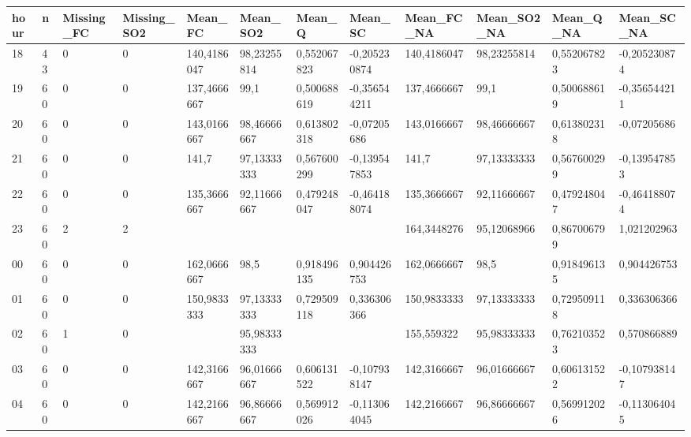 \begin{landscape}

    \begin{table}[!ht]
        \centering
        \begin{tabular}{|l|l|l|l|l|l|l|l|l|l|l|l|}
        \hline
            hour & n & Missing\_FC & Missing\_SO2 & Mean\_FC & Mean\_SO2 & Mean\_Q & Mean\_SC & Mean\_FC\_NA & Mean\_SO2\_NA & Mean\_Q\_NA & Mean\_SC\_NA \\ \hline
            18 & 43 & 0 & 0 & 140,4186047 & 98,23255814 & 0,552067823 & -0,205230874 & 140,4186047 & 98,23255814 & 0,552067823 & -0,205230874 \\ \hline
            19 & 60 & 0 & 0 & 137,4666667 & 99,1 & 0,500688619 & -0,356544211 & 137,4666667 & 99,1 & 0,500688619 & -0,356544211 \\ \hline
            20 & 60 & 0 & 0 & 143,0166667 & 98,46666667 & 0,613802318 & -0,07205686 & 143,0166667 & 98,46666667 & 0,613802318 & -0,07205686 \\ \hline
            21 & 60 & 0 & 0 & 141,7 & 97,13333333 & 0,567600299 & -0,139547853 & 141,7 & 97,13333333 & 0,567600299 & -0,139547853 \\ \hline
            22 & 60 & 0 & 0 & 135,3666667 & 92,11666667 & 0,479248047 & -0,464188074 & 135,3666667 & 92,11666667 & 0,479248047 & -0,464188074 \\ \hline
            23 & 60 & 2 & 2 & ~ & ~ & ~ & ~ & 164,3448276 & 95,12068966 & 0,867006799 & 1,021202963 \\ \hline
            00 & 60 & 0 & 0 & 162,0666667 & 98,5 & 0,918496135 & 0,904426753 & 162,0666667 & 98,5 & 0,918496135 & 0,904426753 \\ \hline
            01 & 60 & 0 & 0 & 150,9833333 & 97,13333333 & 0,729509118 & 0,336306366 & 150,9833333 & 97,13333333 & 0,729509118 & 0,336306366 \\ \hline
            02 & 60 & 1 & 0 & ~ & 95,98333333 & ~ & ~ & 155,559322 & 95,98333333 & 0,762103523 & 0,570866889 \\ \hline
            03 & 60 & 0 & 0 & 142,3166667 & 96,01666667 & 0,606131522 & -0,107938147 & 142,3166667 & 96,01666667 & 0,606131522 & -0,107938147 \\ \hline
            04 & 60 & 0 & 0 & 142,2166667 & 96,86666667 & 0,569912026 & -0,113064045 & 142,2166667 & 96,86666667 & 0,569912026 & -0,113064045 \\ \hline

\end{tabular}
\end{table}
\end{landscape}
